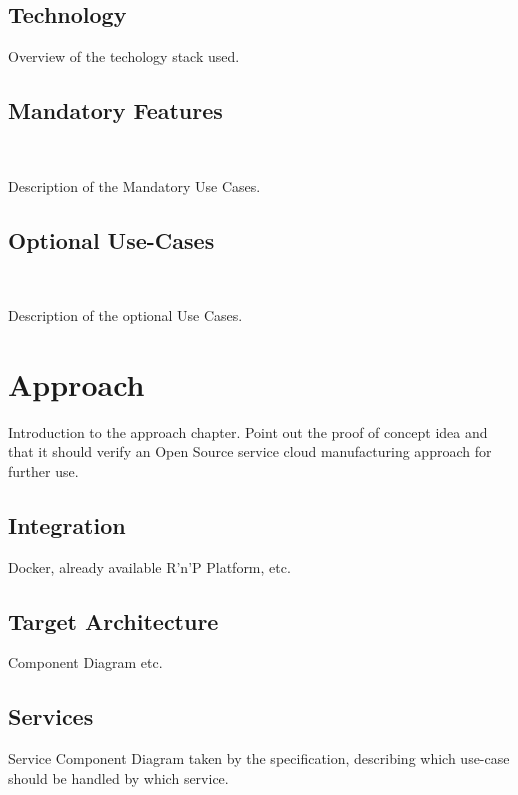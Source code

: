 \documentclass[
a4paper,
twoside,
bibliography=totoc,
headsepline,
cleardoublepage=empty,
parskip=half,
draft=false
]{scrbook}
\begin{document}
			\subsection{Technology} \label{subsec:technology}
			
				Overview of the techology stack used.
			
				
			\subsection{Mandatory Features} \label{subsec:mandatory}
				
				Description of the Mandatory Use Cases.
				
			\subsection{Optional Use-Cases} \label{subsec:optional}	
				
				Description of the optional Use Cases.
				
		\section{Approach} \label{sec:approach}
		
			Introduction to the approach chapter. Point out the proof of concept idea and that it should verify an Open Source service cloud manufacturing approach for further use.
		
			\subsection{Integration} \label{subsec:integration}
			
				Docker, already available R'n'P Platform, etc.
				
			\subsection{Target Architecture} \label{subsec:target_architecture}
			
				Component Diagram etc.
			
			\subsection{Services} \label{subsec:services}
			
				Service Component Diagram taken by the specification, describing which use-case should be handled by which service.
				
\end{document}
